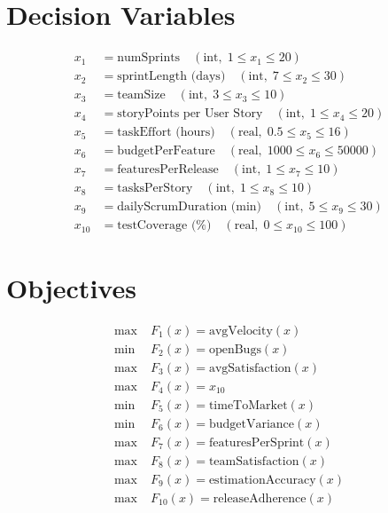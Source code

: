 \documentclass{article}
\begin{document}
\section*{Decision Variables}
\[
\begin{aligned}
x_1 &= \text{numSprints} \quad (\text{int},\;1 \le x_1 \le 20)\\
x_2 &= \text{sprintLength (days)} \quad (\text{int},\;7 \le x_2 \le 30)\\
x_3 &= \text{teamSize} \quad (\text{int},\;3 \le x_3 \le 10)\\
x_4 &= \text{storyPoints per User Story} \quad (\text{int},\;1 \le x_4 \le 20)\\
x_5 &= \text{taskEffort (hours)} \quad (\text{real},\;0.5 \le x_5 \le 16)\\
x_6 &= \text{budgetPerFeature} \quad (\text{real},\;1000 \le x_6 \le 50000)\\
x_7 &= \text{featuresPerRelease} \quad (\text{int},\;1 \le x_7 \le 10)\\
x_8 &= \text{tasksPerStory} \quad (\text{int},\;1 \le x_8 \le 10)\\
x_9 &= \text{dailyScrumDuration (min)} \quad (\text{int},\;5 \le x_9 \le 30)\\
x_{10} &= \text{testCoverage (\%)} \quad (\text{real},\;0 \le x_{10} \le 100)
\end{aligned}
\]

\section*{Objectives}
\begin{align*}
\max\; &F_1(x) = \text{avgVelocity}(x) \\
\min\; &F_2(x) = \text{openBugs}(x) \\
\max\; &F_3(x) = \text{avgSatisfaction}(x) \\
\max\; &F_4(x) = x_{10} \\
\min\; &F_5(x) = \text{timeToMarket}(x) \\
\min\; &F_6(x) = \text{budgetVariance}(x) \\
\max\; &F_7(x) = \text{featuresPerSprint}(x) \\
\max\; &F_8(x) = \text{teamSatisfaction}(x) \\
\max\; &F_9(x) = \text{estimationAccuracy}(x) \\
\max\; &F_{10}(x) = \text{releaseAdherence}(x)
\end{align*}
\end{document}
